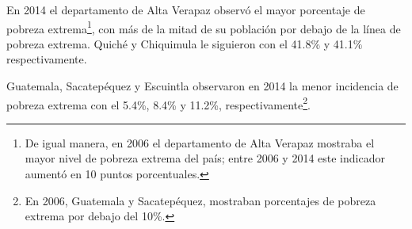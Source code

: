 En 2014 el departamento de Alta Verapaz observó el mayor porcentaje de pobreza extrema\footnote{De igual manera, en 2006 el departamento de Alta Verapaz mostraba el mayor nivel de pobreza extrema del país; entre 2006 y 2014 este indicador aumentó en 10 puntos porcentuales.},  con más de la mitad de su  población por debajo de la línea de pobreza extrema. Quiché y Chiquimula le siguieron  con el 41.8\% y 41.1\% respectivamente. 

Guatemala, Sacatepéquez y Escuintla observaron en 2014 la menor incidencia de pobreza extrema con el 5.4\%, 8.4\% y
11.2\%, respectivamente\footnote{En 2006, Guatemala y Sacatepéquez, mostraban porcentajes de pobreza extrema por debajo del 10\%.}.


